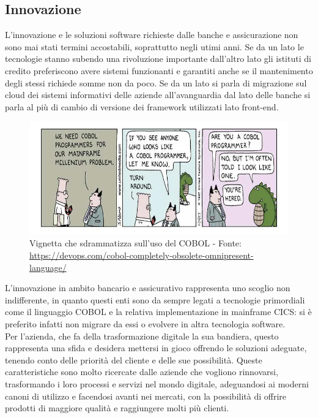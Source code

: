 	
	\subsection{Innovazione}
	
	L'innovazione e le soluzioni software richieste dalle banche e assicurazione non sono mai stati termini accostabili, soprattutto negli utimi anni. Se da un lato le tecnologie stanno subendo una rivoluzione importante dall'altro lato gli istituti di credito preferiscono avere sistemi funzionanti e garantiti anche se il mantenimento degli stessi richiede somme non da poco. Se da un lato si parla di migrazione sul cloud dei sistemi informativi delle aziende all'avanguardia dal lato delle banche si parla al più di cambio di versione dei framework utilizzati lato front-end.\\

	\begin{figure}[H]
	\centering
	\includegraphics[width=1\textwidth]{immagini/VignettaCobol}
	\caption{Vignetta che sdrammatizza sull'uso del COBOL - Fonte: \url{https://devops.com/cobol-completely-obsolete-omnipresent-language/}}
	\end{figure}
	
	L'innovazione in ambito bancario e assicurativo rappresenta uno scoglio non indifferente, in quanto questi enti sono da sempre legati a tecnologie primordiali come il linguaggio COBOL e la relativa implementazione in mainframe CICS: si è preferito infatti non migrare da essi o evolvere in altra tecnologia software.\\
	
	Per l'azienda, che fa della trasformazione digitale la sua bandiera, questo rappresenta una sfida e desidera mettersi in gioco offrendo le soluzioni adeguate, tenendo conto delle priorità del cliente e delle sue possibilità. Queste caratteristiche sono molto ricercate dalle aziende che vogliono rinnovarsi, trasformando i loro processi e servizi nel mondo digitale, adeguandosi ai moderni canoni di utilizzo e facendosi avanti nei mercati, con la possibilità di offrire prodotti di maggiore qualità e raggiungere molti più clienti.\\
	
